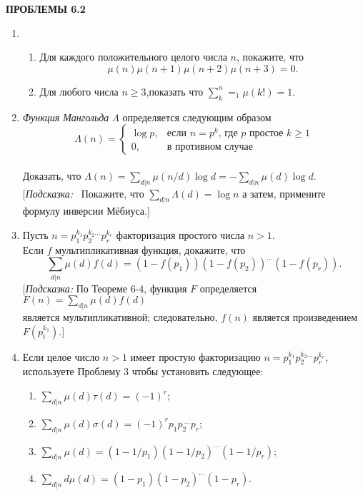 \documentclass[11pt]{article}
\begin{document}
	\begin{center}
	\LARGE {\textsf {\textbf {ПРОБЛЕМЫ 6.2}}}\\[5mm]
\end{center}
\begin{enumerate}
\item 	\begin{enumerate}
\item Для каждого положительного целого числа $n$, покажите, что\\
\[\mu(n)\mu(n+1)\mu(n+2)\mu(n+3)=0.\]
\item Для любого числа $n\ge3$,показать что
$\sum_k^n=_1\mu(k!)=1.$
\end{enumerate}
\item {\it Функция Мангольда} $\Lambda$ определяется следующим образом\\
\[
\Lambda(n)=\begin{cases}
\log{p},&\text{если $n=p^k$, где $p$ простое $k\ge1$} \\
0,&\text{в противном случае}
\end{cases}\]\\
Доказать, что $\Lambda(n)=\sum_{d|n}\mu(n/d)\log{d}=-\sum_{d|n}\mu(d)\log{d}.$ [{\it Подсказка:} ~Покажите, что $\sum_{d|n}\Lambda(d)=\log{n}$ а затем, примените формулу инверсии Мёбиуса.]
\item Пусть $n=p_1^{k_1}p_2^{k_2\dots}p_r^{k_r}$ факторизация простого числа $n>1$.\\
 Если $f$ мультипликативная функция, докажите, что\\
\[
\sum_{d|n}\mu(d)f(d)=(1-f(p_1))(1-f(p_2))^{\dots} (1-f(p_r)).
\]
[{\itshape Подсказка:} По Теореме 6-4, функция $F$ определяется $F(n)=\sum_{d|n}\mu(d)f(d)$\\
 является мультипликативной; следовательно, $f(n)$ является произведением $F(p_i^{k_1})$.]
\item Если целое число $n>1$ имеет простую факторизацию $n=p_1^{k_1}p_2^{k_2\dots}p_r^{k_r}$, используете Проблему 3 чтобы установить следующее:
\begin{enumerate}
	\item $\sum_{d|n}\mu(d)\tau(d)=(-1)^r;$
	\setlength{\parskip}{3mm}
	\item $\sum_{d|n}\mu(d)\sigma(d)=(-1)^rp_1p_{2~} ^{~\dots}p_r;$
	\item $\sum_{d|n}\mu(d)=(1-1/p_1)(1-1/p_2)^{\dots}(1-1/p_r);$
	\item $\sum_{d|n}d\mu(d)=(1-p_1)(1-p_2)^{\dots}(1-p_r).$
\end{enumerate}

\end{enumerate}
\end{document}
